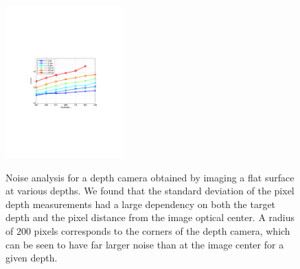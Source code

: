 \begin{figure}
\centering
  \includegraphics[height=5.9cm,trim=110 250 60 260,clip]{Figures/SigmaRadius} \\
\caption{Noise analysis for a depth camera obtained by imaging a flat surface at various depths.  We found that the standard deviation of the pixel depth measurements had a large dependency on both the target depth and the pixel distance from the image optical center.  A radius of $200$ pixels corresponds to the corners of the depth camera, which can be seen to have far larger noise than at the image center for a given depth. }
\label{fig:Noise}
\end{figure}


